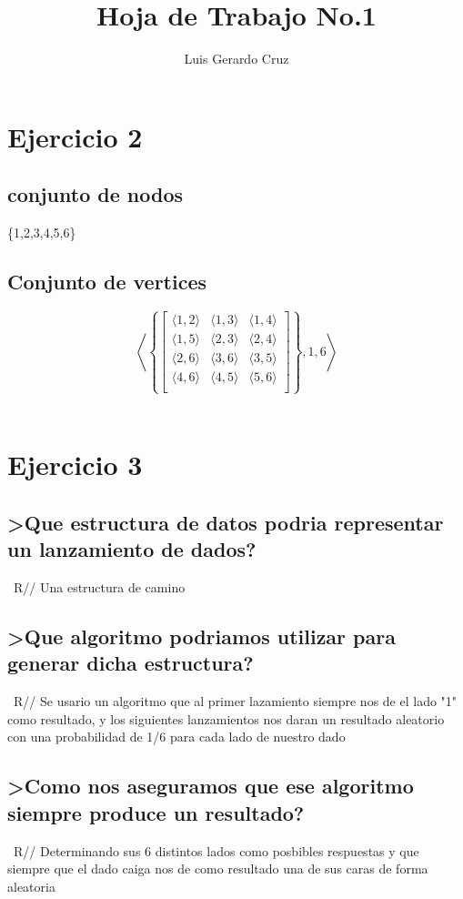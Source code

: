 \documentclass[10pt,a4paper]{article}
\begin{document}
                          
\title{Hoja de Trabajo No.1}\normalsize
\author{Luis Gerardo Cruz}
\maketitle
\section*{Ejercicio 2 }
\subsection{conjunto de nodos}
\{1,2,3,4,5,6\}
\subsection{Conjunto de vertices }

    $$
        \left\langle \left\{
            \begin{bmatrix}
                \langle 1,2 \rangle & \langle 1, 3\rangle & \langle 1,4 \rangle \\
                \langle 1,5 \rangle & \langle 2,3 \rangle & \langle 2,4 \rangle \\
                \langle 2,6 \rangle & \langle 3,6 \rangle & \langle 3,5 \rangle \\
                \langle 4,6 \rangle & \langle 4,5 \rangle & \langle 5,6 \rangle \\
           
            \end{bmatrix}
        \right\}, 1, 6 \right\rangle
    $$ \\
\section*{Ejercicio 3}
\subsection{>Que estructura de datos podria representar un lanzamiento de dados?}
\ R// Una estructura de camino 
\subsection{>Que algoritmo podriamos utilizar para generar dicha estructura?}
\ R// Se usario un algoritmo que al primer lazamiento siempre nos de el lado "1" como resultado, y los siguientes lanzamientos nos daran un resultado aleatorio con una probabilidad de 1/6 para cada lado de nuestro dado 
\subsection{>Como nos aseguramos que ese algoritmo siempre produce un resultado?}
\ R// Determinando sus 6 distintos lados como posbibles respuestas y que siempre que el dado caiga nos de como resultado una de sus caras de forma aleatoria 
\end{document}
